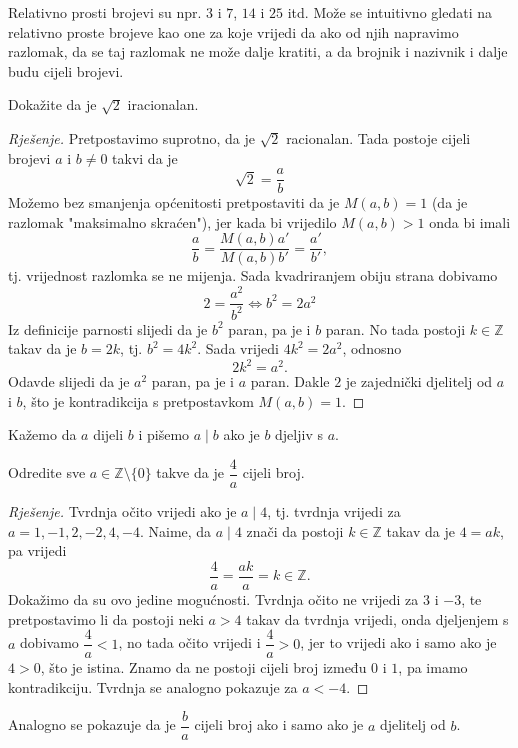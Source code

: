 Relativno prosti brojevi su npr. $3$ i $7$, $14$ i $25$ itd. Može se intuitivno gledati na relativno proste brojeve kao one za koje vrijedi da ako od njih napravimo razlomak, da se taj razlomak ne može dalje kratiti, a da brojnik i nazivnik i dalje budu cijeli brojevi.

\begin{exercise}
Dokažite da je $\sqrt{2}$ iracionalan.
\end{exercise}
\begin{proof}[Rješenje]
Pretpostavimo suprotno, da je $\sqrt{2}$ racionalan. Tada postoje cijeli brojevi $a$ i $b\neq 0$ takvi da je
$$\sqrt{2}=\dfrac{a}{b}$$
Možemo bez smanjenja općenitosti pretpostaviti da je $M(a, b)=1$ (da je razlomak "maksimalno skraćen"), jer kada bi vrijedilo $M(a, b)>1$ onda bi imali
$$\dfrac{a}{b}=\dfrac{M(a, b)a'}{M(a, b)b'}=\dfrac{a'}{b'},$$
tj. vrijednost razlomka se ne mijenja. Sada kvadriranjem obiju strana dobivamo
$$2=\dfrac{a^2}{b^2}\Leftrightarrow b^2=2a^2$$
Iz definicije parnosti slijedi da je $b^2$ paran, pa je i $b$ paran. No tada postoji $k\in \mathbb{Z}$ takav da je $b=2k$, tj. $b^2=4k^2$. Sada vrijedi $4k^2=2a^2$, odnosno $$2k^2=a^2.$$ Odavde slijedi da je $a^2$ paran, pa je i $a$ paran. Dakle $2$ je zajednički djelitelj od $a$ i $b$, što je kontradikcija s pretpostavkom $M(a, b)=1$.
\end{proof}

\begin{definition}
Kažemo da $a$ dijeli $b$ i pišemo $a\; \vert \;b$ ako je $b$ djeljiv s $a$.
\end{definition}

\begin{exercise}
Odredite sve $a\in \mathbb{Z}\setminus \{0\}$ takve da je $\dfrac{4}{a}$ cijeli broj.
\end{exercise}
\begin{proof}[Rješenje]
Tvrdnja očito vrijedi ako je $a\; \vert \;4$, tj. tvrdnja vrijedi za $a=1, -1, 2, -2, 4, -4$. Naime, da $a\; \vert \;4$ znači da postoji $k\in \mathbb{Z}$ takav da je $4=ak$, pa vrijedi $$\dfrac{4}{a}=\dfrac{ak}{a}=k\in \mathbb{Z}.$$ Dokažimo da su ovo jedine mogućnosti. Tvrdnja očito ne vrijedi za $3$ i $-3$, te pretpostavimo li da postoji neki $a>4$ takav da tvrdnja vrijedi, onda djeljenjem s $a$ dobivamo $\dfrac{4}{a}<1$, no tada očito vrijedi i $\dfrac{4}{a}>0$, jer to vrijedi ako i samo ako je $4>0$, što je istina. Znamo da ne postoji cijeli broj između $0$ i $1$, pa imamo kontradikciju. Tvrdnja se analogno pokazuje za $a<-4$.
\end{proof}
Analogno se pokazuje da je $\dfrac{b}{a}$ cijeli broj ako i samo ako je $a$ djelitelj od $b$.

